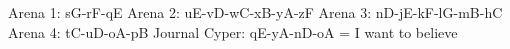 Arena 1: sG-rF-qE
Arena 2: uE-vD-wC-xB-yA-zF
Arena 3: nD-jE-kF-lG-mB-hC
Arena 4: tC-uD-oA-pB
Journal Cyper: qE-yA-nD-oA = I want to believe